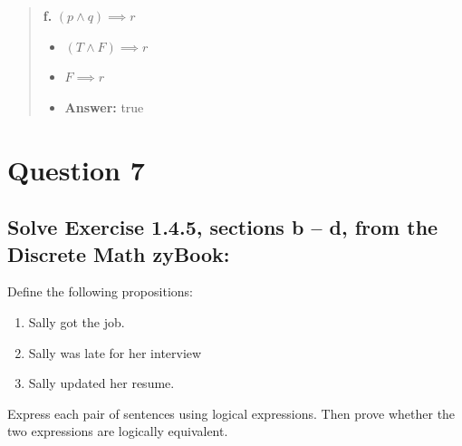 \documentclass[11pt, oneside]{article}
\begin{document}
\begin{quote}
    \textbf{f. }$(p \land q) \implies r$

    \begin{itemize}
        \item $(T \land F) \implies r$
        \item $F \implies r$
        \item \textbf{Answer:} true
    \end{itemize}
\end{quote}

\pagebreak

\section*{Question 7}

\subsection*{Solve Exercise 1.4.5, sections b – d, from the Discrete Math zyBook:}

Define the following propositions:

\begin{enumerate}
    \item[j:] Sally got the job.
    \item[l:] Sally was late for her interview
    \item[r:] Sally updated her resume.
\end{enumerate}

Express each pair of sentences using logical expressions. Then prove whether the two expressions are logically equivalent.
\end{document}
